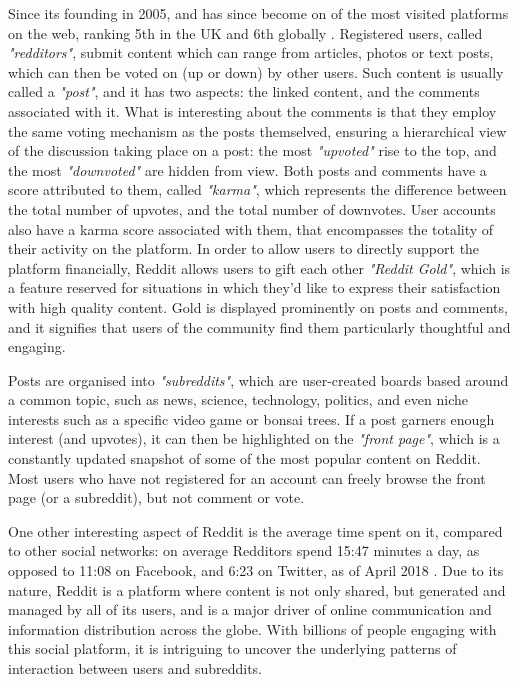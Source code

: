 \documentclass[bsc,frontabs,twoside,singlespacing,parskip,deptreport]{infthesis}
\begin{document}
Since its founding in 2005, and has since become on of the most visited platforms on the web, ranking 5th in the UK and 6th globally \cite{alexa}. Registered users, called \textit{"redditors"}, submit content which can range from articles, photos or text posts, which can then be voted on (up or down) by other users. Such content is usually called a \textit{"post"}, and it has two aspects: the linked content, and the comments associated with it. What is interesting about the comments is that they employ the same voting mechanism as the posts themselved, ensuring a hierarchical view of the discussion taking place on a post: the most \textit{"upvoted"} rise to the top, and the most \textit{"downvoted"} are hidden from view. Both posts and comments have a score attributed to them, called \textit{"karma"}, which represents the difference between the total number of upvotes, and the total number of downvotes. User accounts also have a karma score associated with them, that encompasses the totality of their activity on the platform. In order to allow users to directly support the platform financially, Reddit allows users to gift each other \textit{"Reddit Gold"}, which is a feature reserved for situations in which they'd like to express their satisfaction with high quality content. Gold is displayed prominently on posts and comments, and it signifies that users of the community find them particularly thoughtful and engaging.

Posts are organised into \textit{"subreddits"}, which are user-created boards based around a common topic, such as news, science, technology, politics, and even niche interests such as a specific video game or bonsai trees. If a post garners enough interest (and upvotes), it can then be highlighted on the \textit{"front page"}, which is a constantly updated snapshot of some of the most popular content on Reddit. Most users who have not registered for an account can freely browse the front page (or a subreddit), but not comment or vote.

One other interesting aspect of Reddit is the average time spent on it, compared to other social networks: on average Redditors spend 15:47 minutes a day, as opposed to 11:08 on Facebook, and 6:23 on Twitter, as of April 2018 \cite{alexa}. Due to its nature, Reddit is a platform where content is not only shared, but generated and managed by all of its users, and is a major driver of online communication and information distribution across the globe. With billions of people engaging with this social platform, it is intriguing to uncover the underlying patterns of interaction between users and subreddits.
\end{document}
